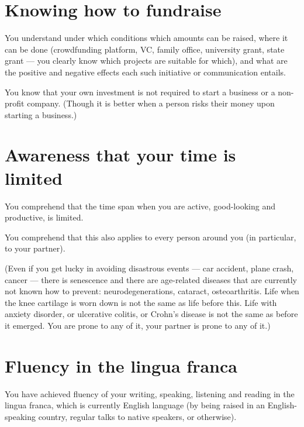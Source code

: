 \documentclass[11pt]{article}
\theoremstyle{remark}
\theoremstyle{definition}
\begin{document}
\section{Knowing how to fundraise}

You understand under which conditions which amounts can be raised, where it can be done (crowdfunding platform, VC, family office, university grant, state grant --- you clearly know which projects are suitable for which), and what are the positive and negative effects each such initiative or communication entails.



You know that your own investment is not required to start a business or a non-profit company. (Though it is better when a person risks their money upon starting a business.)


\section{Awareness that your time is limited}





You comprehend that the time span when you are active, good-looking and productive, is limited. 

You comprehend that this also applies to every person around you (in particular, to your partner). 


(Even if you get lucky in avoiding disastrous events --- car accident, plane crash, cancer --- there is senescence and there are age-related diseases that are currently not known how to prevent: neurodegenerations, cataract, osteoarthritis. Life when the knee cartilage is worn down is not the same as life before this. Life with anxiety disorder, or ulcerative colitis, or Crohn's disease is not the same as before it emerged. You are prone to any of it, your partner is prone to any of it.) 





\section{Fluency in the lingua franca}

You have achieved fluency of your writing, speaking, listening and reading in the lingua franca, which is currently English language (by being raised in an English-speaking country, regular talks to native speakers, or otherwise).
\end{document}
